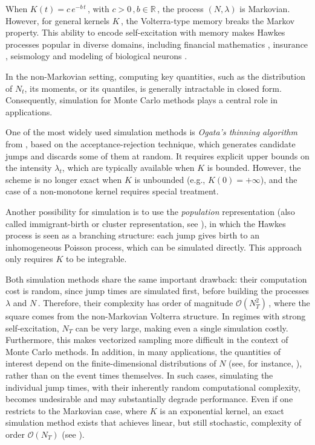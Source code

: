 \documentclass{article}
\newcommand{\R}{\mathbb{R}}
\newcommand{\1}{\mathbbm{1}}
\numberwithin{equation}{section}
\begin{document}
When $K(t) = c\,e^{-b\,t}\,$, with $c > 0\,, b \in \R\,$, the process $(N, \lambda)$ is Markovian. However, for general kernels $K\,$, the Volterra-type memory breaks the Markov property. This ability to encode self-excitation with memory makes Hawkes processes popular in diverse domains, including financial mathematics \citep*{bacry2015hawkes, hawkes2018hawkes, embrechts2011multivariate, rosenbaum2021microscopic}, insurance \citep*{lesage2022hawkes, bessy2021multivariate, baldwin2017contagion, hillairet2023expansion}, seismology \citep*{ogata1988statistical, davis2024fractional} and modeling of biological neurons \citep{hodara2017hawkes, goncalves2022perfect}.

In the non-Markovian setting, computing key quantities, such as the distribution of $N_t$, its moments, or its quantiles, is generally intractable in closed form. Consequently, simulation  for Monte Carlo methods plays a central role in applications.

One of the most widely used simulation methods is \textit{Ogata's thinning algorithm} from \citet{Ogata81}, based on the acceptance-rejection technique, which generates candidate jumps and discards some of them at random. It requires explicit upper bounds on the intensity $\lambda_t$, which are typically available when $K$ is bounded. However, the scheme is no longer exact when $K$ is unbounded (e.g., $K(0) = +\infty$), and the case of a non-monotone kernel requires special treatment.

Another possibility for simulation is to use the \textit{population} representation (also called immigrant-birth or cluster representation, see \citet{hawkes1974cluster, Moller2005}), in which the Hawkes process is seen as a branching structure: each jump gives birth to an inhomogeneous Poisson process, which can be simulated directly. This approach only requires $K$ to be integrable.

Both simulation methods share the same important drawback: their computation cost is random, since jump times are simulated first, before building the processes $\lambda$ and $N\,$. Therefore, their complexity has order of magnitude $\mathcal O(N_T^2)\,$, where the square comes from the non-Markovian Volterra structure. In regimes with strong self-excitation, $N_T$ can be very large, making even a single simulation costly. Furthermore, this makes vectorized sampling more difficult in the context of Monte Carlo methods. In addition, in many applications, the quantities of interest depend on the finite-dimensional distributions of 
$N$ (see, for instance, \citet*{lesage2022hawkes, bessy2021multivariate}), rather than on the event times themselves. In such cases, simulating the individual jump times, with their inherently random computational complexity, becomes undesirable and may substantially degrade performance. Even if one restricts to the Markovian case, where 
$K$ is an exponential kernel, an exact simulation method exists that achieves linear, but still stochastic,  complexity of order 
 $\mathcal O (N_T)$ (see \citet{Dassios13}). 
 
\end{document}
